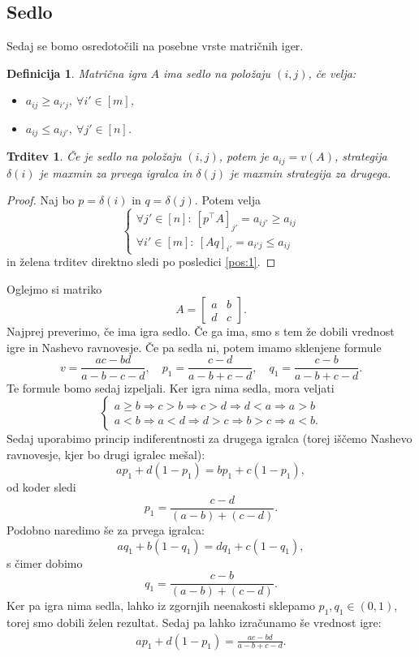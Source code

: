 \documentclass[10pt, a4paper]{article}
\newtheorem{trditev}[izr]{Trditev}
\newtheorem{defi}[izr]{Definicija}
\newenvironment{noticeB}{%
  \tcolorbox[%
  notitle,
  empty,
  enhanced,  %
  breakable,
  coltext=black,
  colback=white, 
  fontupper=\rmfamily,
  parbox=false,
  noparskip,
  sharp corners,
  boxrule=-1pt,  %
  frame hidden,
  left=7pt,  %
  right=7pt,
  top=5pt,
  bottom=5pt,
  before skip=2.5ex plus 2pt,
  after skip=2.5ex plus 2pt,
  borderline west = {1.5pt}{-0.1pt}{blue!30!black}, %
  overlay unbroken and last={%
    \draw[color=black, line width=1.25pt]
    ($(frame.south west)+(1.pt, -0.1pt)$) -- ++(2em, 0);
  }
  ]}
{\endtcolorbox}
\newenvironment{definicija}{\begin{defi}\begin{noticeB}}{%
    \end{noticeB}\end{defi}}
\newenvironment{noticeC}{%
  \tcolorbox[%
  notitle,
  empty,
  enhanced,  %
  breakable,
  coltext=black, 
  fontupper=\rmfamily,
  parbox=false,
  noparskip,
  sharp corners,
  boxrule=-1pt,  %
  frame hidden,
  left=7pt,  %
  right=7pt,
  top=5pt,
  bottom=5pt,
  before skip=2.5ex plus 2pt,
  after skip=2.5ex plus 2pt,
  overlay unbroken and last={%
  },
  ]}
{\endtcolorbox}
\newenvironment{dokaz}%
  {\begin{noticeC}\begin{proof}}%
  {\end{proof}\end{noticeC}}
\begin{document}
\subsection{Sedlo}

Sedaj se bomo osredotočili na posebne vrste matričnih iger.

\begin{definicija}
  Matrična igra $A$ ima sedlo na položaju $(i, j)$, če velja:
  \begin{itemize}
    \item $a_{ij} \geq a_{i'j},\ \forall i' \in [m]$,
    \item $a_{ij} \leq a_{ij'},\ \forall j' \in [n]$.
  \end{itemize}
\end{definicija}

\begin{trditev}
  Če je sedlo na položaju $(i, j)$, potem je $a_{ij} = v(A)$, strategija $\delta(i)$ je maxmin za prvega igralca 
  in $\delta(j)$ je maxmin strategija za drugega.
\end{trditev}

\begin{dokaz}
  Naj bo $p = \delta(i)$ in $q = \delta(j)$. Potem velja 
  $$\begin{cases}
    \forall j' \in [n]:\ [p^\top A]_{j'} = a_{ij'} \geq a_{ij}\\
    \forall i' \in [m]:\ [Aq]_{i'} = a_{i'j} \leq a_{ij}
  \end{cases}$$
  in želena trditev direktno sledi po posledici \ref{pos:1}.
\end{dokaz}

  Oglejmo si matriko 
  $$A = \begin{bmatrix}
    a & b\\
    d & c
  \end{bmatrix}.$$
  Najprej preverimo, če ima igra sedlo. 
  Če ga ima, smo s tem že dobili vrednost igre in Nashevo ravnovesje.
  Če pa sedla ni, potem imamo sklenjene formule 
  $$v = \frac{ac - bd}{a - b - c - d},\quad p_1 = \frac{c - d}{a - b + c - d},\quad q_1 = \frac{c - b}{a - b + c - d}.$$
  Te formule bomo sedaj izpeljali. Ker igra nima sedla, mora veljati 
  $$\begin{cases}
    a \geq b \Rightarrow c > b \Rightarrow c > d \Rightarrow d < a \Rightarrow a > b\\
    a < b \Rightarrow a < d \Rightarrow d > c \Rightarrow b > c \Rightarrow a < b.
  \end{cases}$$
  Sedaj uporabimo princip indiferentnosti za drugega igralca (torej iščemo Nashevo ravnovesje, kjer bo drugi igralec mešal):
  $$ap_1 + d(1 - p_1) = b p_1 + c (1 - p_1),$$
  od koder sledi 
  $$p_1 = \frac{c - d}{(a - b) + (c - d)}.$$
  Podobno naredimo še za prvega igralca:
  $$aq_1 + b(1 - q_1) = d q_1 + c(1 - q_1),$$
  s čimer dobimo $$q_1 = \frac{c - b}{(a - b) + (c - d)}.$$
  Ker pa igra nima sedla, lahko iz zgornjih neenakosti sklepamo $p_1, q_1 \in (0, 1)$,
  torej smo dobili želen rezultat. Sedaj pa lahko izračunamo še vrednost igre:
  \begin{align*}
    ap_1 + d(1 - p_1) = \frac{ac - bd}{a -b + c - d}.
  \end{align*}
\end{document}

